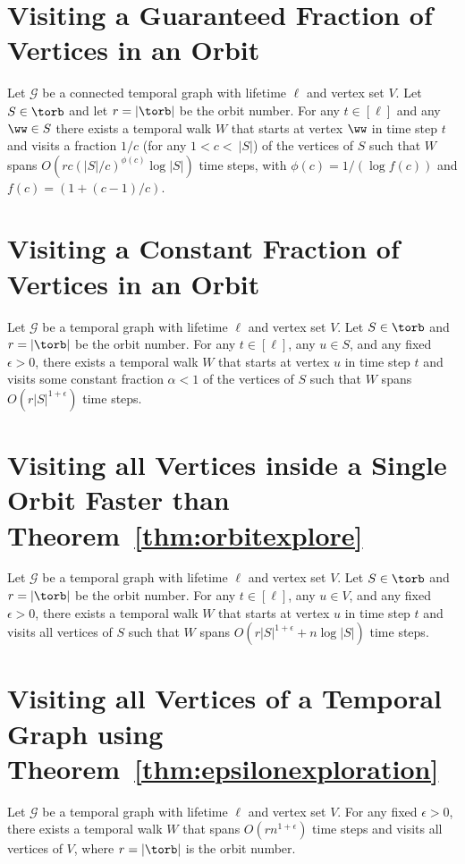 {\section{Visiting a Guaranteed Fraction of Vertices in an Orbit}
\begin{lemma} Let $\mathcal{G}$ be a connected
    temporal graph with lifetime $\ell$ and vertex set $V$. Let $S \in \torb$
    and let $r=|\torb|$ be the orbit number. For any $t\in[\ell]$ and any
    {$\ww \in S$} there exists a temporal walk $W$ that starts at vertex
    $\ww$ in time step $t$ and visits a fraction $1/c$ (for any $1 < c <\
    |S|$) of the vertices of $S$ such that $W$ spans $O(rc(|S|/c)^{\phi(c)}
    \log |S|)$ time steps, with $\phi(c)=1/(\log {f(c)})$ and
    $f(c)=(1+(c-1)/c)$.
\end{lemma}
\proofvtexplorationub

\section{Visiting a Constant Fraction of Vertices in an Orbit}
\begin{corollary}\label{cor:tinyfraction} Let $\mathcal{G}$ be a temporal graph
    with lifetime $\ell$ and vertex set $V$. Let $S \in \torb$ and $r=|\torb|$
    be the orbit number. For any $t\in[\ell]$, any $u \in S$, and any fixed
    $\epsilon > 0$,  there exists a temporal walk $W$ that starts at vertex $u$
    in time step $t$ and visits some constant fraction $\alpha < 1$  
    of the vertices of
    $S$ such that 
    $W$ spans $O(r|S|^{1+\epsilon})$ time steps.     
\end{corollary}
\prooftinyfraction

\section{Visiting all Vertices inside a Single Orbit Faster than Theorem~\ref{thm:orbitexplore}}
\begin{theorem} Let $\mathcal{G}$ be a temporal
    graph with lifetime $\ell$ and vertex set $V$. Let $S \in \torb$ and
    $r=|\torb|$ be the orbit number. For any $t\in[\ell]$, any $u \in V$, and
    any fixed $\epsilon > 0$, there exists a temporal walk $W$ that starts at
    vertex $u$ in time step $t$ and visits all vertices of $S$ such that $W$
    spans $O(r|S|^{1+\epsilon} + n \log |S|)$ time steps.
\end{theorem}
\proofepsilonexploration

\section{Visiting all Vertices of a Temporal Graph using Theorem~\ref{thm:epsilonexploration}}
\begin{corollary} Let $\mathcal{G}$ be a temporal
    graph with lifetime $\ell$ and vertex set $V$.
    For any fixed $\epsilon>0$, there exists a temporal walk
    $W$ that spans $O(r n^{1+\epsilon})$ time steps and visits all vertices of
    $V$, where $r=|\torb|$ is the orbit number.
\end{corollary}
\proofepsilonallorbits

}
